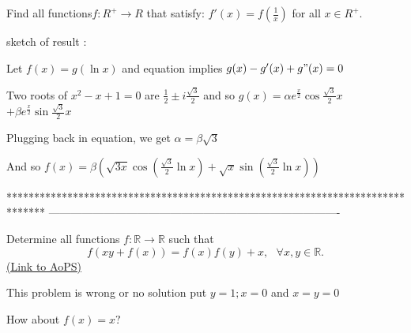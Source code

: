 \begin{solution}
	\begin{tcolorbox}Find all functions$f:R^+\to R$  that satisfy:
$  f'(x)=f(\frac{1}{x}) $ 
 for all $x\in R^+$.\end{tcolorbox}
sketch of result :

Let $f(x)=g(\ln x)$ and equation implies $g(x)-g'(x)+g"(x)=0$

Two roots of $x^2-x+1=0$ are $\frac 12\pm i\frac{\sqrt 3}2$ and so  $g(x)=\alpha e^{\frac x2}\cos\frac{\sqrt 3}2x$ $ + \beta e^{\frac x2}\sin\frac{\sqrt 3}2x$

Plugging back in equation, we get $\alpha=\beta\sqrt 3$

And so $\boxed{f(x)=\beta\left( \sqrt{3x}\cos\left(\frac{\sqrt 3}2\ln x\right) +  \sqrt x\sin\left(\frac{\sqrt 3}2\ln x\right)\right)}$
\end{solution}
*******************************************************************************
-------------------------------------------------------------------------------

\begin{problem}
	Determine all functions $f : \mathbb{R} \to \mathbb{R}$ such that \[f(xy+f(x))=f(x)f(y)+x , \ \ \ \forall x,y \in  \mathbb{R}.\]
	\flushright \href{https://artofproblemsolving.com/community/c6h607692}{(Link to AoPS)}
\end{problem}



\begin{solution}
	This problem is wrong or no solution put $ y=1; x=0 $ and $ x=y=0 $
\end{solution}



\begin{solution}
	How about $f(x)=x?$
\end{solution}



